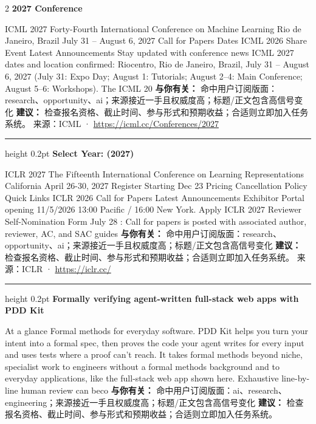 \documentclass[10.5pt]{ctexart}
\begin{document}
\begin{multicols}{2}
{\large\bfseries 2027 Conference}\par
ICML 2027 Forty-Fourth International Conference on Machine Learning Rio de Janeiro, Brazil July 31 – August 6, 2027 Call for Papers Dates ICML 2026 Share Event Latest Announcements Stay updated with conference news ICML 2027 dates and location confirmed: Riocentro, Rio de Janeiro, Brazil, July 31 – August 6, 2027 (July 31: Expo Day; August 1: Tutorials; August 2–4: Main Conference; August 5–6: Workshops). The ICML 20
\textbf{与你有关：} 命中用户订阅版面：research、opportunity、ai；来源接近一手且权威度高；标题/正文包含高信号变化
\textbf{建议：} 检查报名资格、截止时间、参与形式和预期收益；合适则立即加入任务系统。
{\footnotesize\color{ormuted} 来源：ICML · \url{https://icml.cc/Conferences/2027}}
\vspace{2mm}
\hrule height 0.2pt
\vspace{2mm}
{\large\bfseries Select Year: (2027)}\par
ICLR 2027 The Fifteenth International Conference on Learning Representations California April 26-30, 2027 Register Starting Dec 23 Pricing Cancellation Policy Quick Links ICLR 2026 Call for Papers Latest Announcements Exhibitor Portal opening 11/5/2026 13:00 Pacific / 16:00 New York. Apply ICLR 2027 Reviewer Self-Nomination Form July 28 : Call for papers is posted with associated author, reviewer, AC, and SAC guides 
\textbf{与你有关：} 命中用户订阅版面：research、opportunity、ai；来源接近一手且权威度高；标题/正文包含高信号变化
\textbf{建议：} 检查报名资格、截止时间、参与形式和预期收益；合适则立即加入任务系统。
{\footnotesize\color{ormuted} 来源：ICLR · \url{https://iclr.cc/}}
\vspace{2mm}
\hrule height 0.2pt
\vspace{2mm}
{\large\bfseries Formally verifying agent-written full-stack web apps with PDD Kit}\par
At a glance Formal methods for everyday software. PDD Kit helps you turn your intent into a formal spec, then proves the code your agent writes for every input and uses tests where a proof can’t reach. It takes formal methods beyond niche, specialist work to engineers without a formal methods background and to everyday applications, like the full-stack web app shown here. Exhaustive line-by-line human review can beco
\textbf{与你有关：} 命中用户订阅版面：ai、research、engineering；来源接近一手且权威度高；标题/正文包含高信号变化
\textbf{建议：} 检查报名资格、截止时间、参与形式和预期收益；合适则立即加入任务系统。

\end{multicols}
\end{document}
